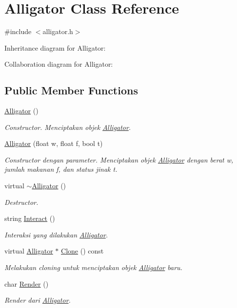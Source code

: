 \hypertarget{classAlligator}{}\section{Alligator Class Reference}
\label{classAlligator}


{\ttfamily \#include $<$alligator.\+h$>$}



Inheritance diagram for Alligator\+:


Collaboration diagram for Alligator\+:
\subsection*{Public Member Functions}
\begin{DoxyCompactItemize}
\item 
\hyperlink{classAlligator_af1f21eea8d991b0ceb892448f456e587}{Alligator} ()
\begin{DoxyCompactList}\small\item\em Constructor. Menciptakan objek \hyperlink{classAlligator}{Alligator}. \end{DoxyCompactList}\item 
\hyperlink{classAlligator_a8adf9cbeba2884e609da9fd282edba93}{Alligator} (float w, float f, bool t)
\begin{DoxyCompactList}\small\item\em Constructor dengan parameter. Menciptakan objek \hyperlink{classAlligator}{Alligator} dengan berat w, jumlah makanan f, dan status jinak t. \end{DoxyCompactList}\item 
virtual \hyperlink{classAlligator_a9504f449fe1f01c94c0052f994340b14}{$\sim$\+Alligator} ()
\begin{DoxyCompactList}\small\item\em Destructor. \end{DoxyCompactList}\item 
string \hyperlink{classAlligator_a8f6141caa973d33f2066c3561cd817b3}{Interact} ()
\begin{DoxyCompactList}\small\item\em Interaksi yang dilakukan \hyperlink{classAlligator}{Alligator}. \end{DoxyCompactList}\item 
virtual \hyperlink{classAlligator}{Alligator} $\ast$ \hyperlink{classAlligator_aa317f0d37332919f638128c41cd7b53f}{Clone} () const 
\begin{DoxyCompactList}\small\item\em Melakukan cloning untuk menciptakan objek \hyperlink{classAlligator}{Alligator} baru. \end{DoxyCompactList}\item 
char \hyperlink{classAlligator_aa8f0a207888bf7f682ebc6b57270dd33}{Render} ()
\begin{DoxyCompactList}\small\item\em Render dari \hyperlink{classAlligator}{Alligator}. \end{DoxyCompactList}\end{DoxyCompactItemize}
